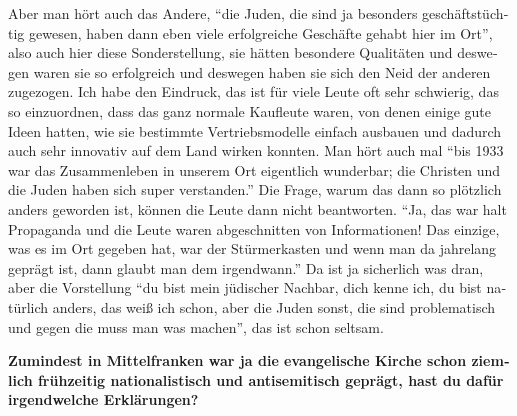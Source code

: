 \begin{otherlanguage}{ngerman}
Aber man hört auch das Andere, "`die Juden, die sind ja besonders geschäftstüchtig gewesen, haben dann eben viele erfolgreiche Geschäfte gehabt hier im Ort"', also auch hier diese Sonderstellung, sie hätten besondere Qualitäten und deswegen waren sie so erfolgreich und deswegen haben sie sich den Neid der anderen zugezogen. Ich habe den Eindruck, das ist für viele Leute oft sehr schwierig, das so einzuordnen, dass das ganz normale Kaufleute waren, von denen einige gute Ideen hatten, wie sie bestimmte Vertriebsmodelle einfach ausbauen und dadurch auch sehr innovativ auf dem Land wirken konnten. 
Man hört auch mal "`bis 1933 war das Zusammenleben in unserem Ort eigentlich wunderbar; die Christen und die Juden haben sich super verstanden."' Die Frage, warum das dann so plötzlich anders geworden ist, können die Leute dann nicht beantworten. "`Ja, das war halt Propaganda und die Leute waren abgeschnitten von Informationen! Das einzige, was es im Ort gegeben hat, war der Stürmerkasten und wenn man da jahrelang geprägt ist, dann glaubt man dem irgendwann."' 
Da ist ja sicherlich was dran, aber die Vorstellung "`du bist mein jüdischer Nachbar, dich kenne ich, du bist natürlich anders, das weiß ich schon, aber die Juden sonst, die sind problematisch und gegen die muss man was machen"', das ist schon seltsam. 

 
\textbf{Zumindest in Mittelfranken war ja die evangelische Kirche schon ziemlich frühzeitig nationalistisch und antisemitisch geprägt, hast du dafür irgendwelche Erklärungen?} 


\end{otherlanguage}
